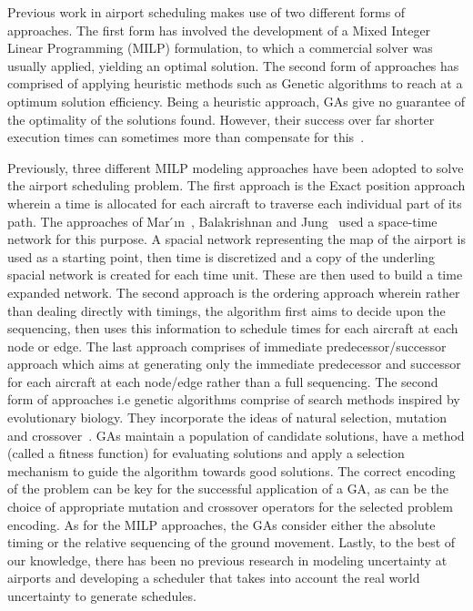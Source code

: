 \documentclass[conference]{IEEEtran}
\begin{document}
Previous work in airport scheduling makes use of two different forms of approaches. The first form has involved the development of a Mixed Integer Linear Programming (MILP) formulation, to which a commercial solver was usually applied, yielding an optimal solution. The second form of approaches has comprised of applying heuristic methods such as Genetic algorithms to reach at a optimum solution efficiency. Being a heuristic approach, GAs give no guarantee of the optimality of the solutions found. However, their success over far shorter execution times can sometimes more than compensate for this~\cite{atkin2010airport}.

Previously, three different MILP modeling approaches have been adopted to solve the airport scheduling problem. The first approach is the Exact position approach wherein a time is allocated for each aircraft to traverse each individual part of its path. The approaches of Mar ́ın~\cite{marin2006airport}, Balakrishnan and Jung~\cite{roling2008optimal} used a space-time network for this purpose. A spacial network representing the map of the airport is used as a starting point, then time is discretized and a copy of the underling spacial network is created for each time unit. These are then used to build a time expanded network. The second approach is the ordering approach wherein rather than dealing directly with timings, the algorithm first aims to decide upon the sequencing, then uses this information to schedule times for each aircraft at each node or edge. The last approach comprises of immediate predecessor/successor approach which aims at generating only the immediate predecessor and successor for each aircraft at each node/edge rather than a full sequencing. The second form of approaches i.e genetic algorithms comprise of  search methods inspired by evolutionary biology. They incorporate the ideas of natural selection, mutation and crossover~\cite{burke2005search}. GAs maintain a population of candidate solutions, have a method (called a fitness function) for evaluating solutions and apply a selection mechanism to guide the algorithm towards good solutions. The correct encoding of the problem can be key for the successful application of a GA, as can be the choice of appropriate mutation and crossover operators for the selected problem encoding. As for the MILP approaches, the GAs consider either the absolute timing or the relative sequencing of the ground movement. Lastly, to the best of our knowledge, there has been no previous research in modeling uncertainty at airports and developing a scheduler that takes into account the real world uncertainty to generate schedules.
\end{document}
